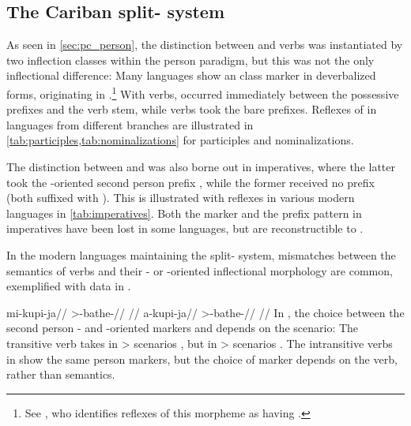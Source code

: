 \subsection{The Cariban split- system}
\label{sec:split}
As seen in \cref{sec:pc_person}, the \PC distinction between  and  verbs was instantiated by two inflection classes within the \setone person paradigm, but this was not the only inflectional difference:
%
Many languages show an  class marker in deverbalized forms, originating in \PC {}.\footnote{See \textcite[227]{meira2000split}, who identifies reflexes of this morpheme as having .}
With  verbs,  occurred immediately between the possessive prefixes and the verb stem, while  verbs took the bare prefixes.
Reflexes of  in languages from different branches are illustrated in \cref{tab:participles,tab:nominalizations} for participles and nominalizations.%
%
%
%
%
%

%
The distinction between  and  was also borne out in imperatives, where the latter took the -oriented second person prefix , while the former received no prefix (both suffixed with ).
This is illustrated with reflexes in various modern languages in \cref{tab:imperatives}.
Both the  marker  and the prefix pattern in imperatives have been lost in some languages, but are reconstructible to \PC.


In the modern languages maintaining the split- system, mismatches between the semantics of verbs and their - or -oriented inflectional morphology are common, exemplified with \kalina data in .

 \kalina
{}
\begingl
\gla mi-kupi-ja//
\glb {}>-bathe-//
\glft {} \parencite[][160]{hoff1968carib}//
\endgl
{}
\begingl
\gla a-kupi-ja//
\glb {}>-bathe-//
\glft {} \parencite[][63]{yamada2011evidentiality}//
\endgl
\xe
%
In , the choice between the second person - and -oriented markers  and  depends on the scenario:
The transitive verb   takes  in > scenarios , but  in > scenarios .
The intransitive verbs in  show the same person markers, but the choice of marker depends on the verb, rather than semantics.

